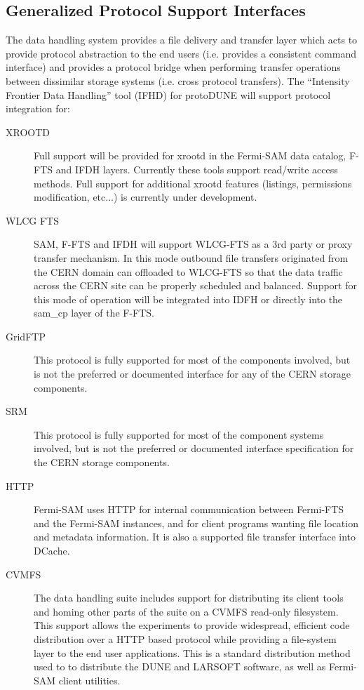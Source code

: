 \documentclass[12pt]{article}
\newcommand{\pd}{protoDUNE\xspace}
\begin{document}
\subsection{Generalized Protocol Support Interfaces}
The data handling system provides a file delivery and transfer layer which acts to provide protocol abstraction
to the end users (i.e. provides a consistent command interface) and provides a protocol bridge when performing
transfer operations between dissimilar storage systems (i.e. cross protocol transfers).  The ``Intensity Frontier
Data Handling'' tool (IFHD) for \pd will support protocol integration for:
\begin{description}
\item[XROOTD] Full support will be provided for xrootd in the Fermi-SAM data catalog, F-FTS and IFDH layers.
Currently these tools support read/write access methods.  Full support for additional xrootd features (listings,
permissions modification, etc...) is currently under development.

\item[WLCG FTS] SAM, F-FTS and IFDH will support WLCG-FTS as a 3rd party or proxy transfer mechanism.
 In this mode outbound file transfers originated from the CERN domain can offloaded to WLCG-FTS so that the
data traffic across the CERN site can be properly scheduled and balanced.  Support for this mode of operation
will be integrated into IDFH or directly into the sam\_cp layer of the F-FTS. 

\item[GridFTP] This protocol is fully supported for most of the components involved, but is not the preferred or
documented interface for any of the CERN storage components.

\item[SRM] This protocol is fully supported for most of the component systems involved, but is not the preferred
or documented interface specification for the CERN storage components.

\item[HTTP] Fermi-SAM uses HTTP for internal communication between Fermi-FTS and the Fermi-SAM instances,
and for client programs wanting file location and metadata information. It is also a supported file transfer interface
into DCache.

\item[CVMFS] The data handling suite includes support for distributing its client tools and homing other parts of
the suite on a CVMFS read-only filesystem.  This support allows the experiments to provide widespread,
efficient code distribution over a HTTP based protocol while providing a file-system layer to the end user
applications.  This is a standard distribution method used to to distribute the DUNE and LARSOFT software,
as well as Fermi-SAM client utilities. 
\end{description}
\end{document}
